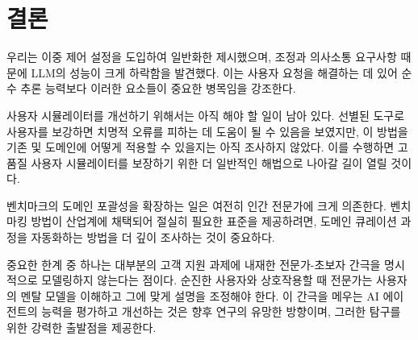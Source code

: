 \section{결론}
\label{sec:conclusion}

우리는 이중 제어 설정을 도입하여  일반화한  제시했으며, 조정과 의사소통 요구사항 때문에 LLM의 성능이 크게 하락함을 발견했다. 이는 사용자 요청을 해결하는 데 있어 순수 추론 능력보다 이러한 요소들이 중요한 병목임을 강조한다.

사용자 시뮬레이터를 개선하기 위해서는 아직 해야 할 일이 남아 있다. 선별된 도구로 사용자를 보강하면 치명적 오류를 피하는 데 도움이 될 수 있음을 보였지만, 이 방법을 기존 \airline 및 \retail 도메인에 어떻게 적용할 수 있을지는 아직 조사하지 않았다. 이를 수행하면 고품질 사용자 시뮬레이터를 보장하기 위한 더 일반적인 해법으로 나아갈 길이 열릴 것이다. 

벤치마크의 도메인 포괄성을 확장하는 일은 여전히 인간 전문가에 크게 의존한다. 벤치마킹 방법이 산업계에 채택되어 절실히 필요한 표준을 제공하려면, 도메인 큐레이션 과정을 자동화하는 방법을 더 깊이 조사하는 것이 중요하다.

 중요한 한계 중 하나는 대부분의 고객 지원 과제에 내재한 전문가-초보자 간극을 명시적으로 모델링하지 않는다는 점이다. 순진한 사용자와 상호작용할 때 전문가는 사용자의 멘탈 모델을 이해하고 그에 맞게 설명을 조정해야 한다. 이 간극을 메우는 AI 에이전트의 능력을 평가하고 개선하는 것은 향후 연구의 유망한 방향이며,  그러한 탐구를 위한 강력한 출발점을 제공한다.
